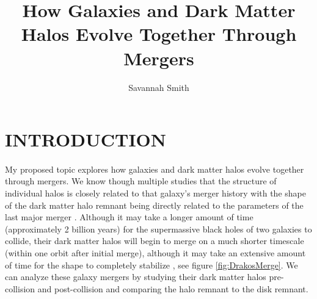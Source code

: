 \documentclass[linenumbers,trackchanges]{aastex7}
\begin{document}
\title{How Galaxies and Dark Matter Halos Evolve Together Through Mergers}

\author{Savannah Smith}

\section{INTRODUCTION} 

\paragraph{} My proposed topic explores how galaxies and dark matter halos evolve together through mergers. We know though multiple studies that the structure of individual halos is closely related to that galaxy's merger history with the shape of the dark matter halo remnant being directly related to the parameters of the last major merger \citep{Drakos+2019}. Although it may take a longer amount of time (approximately 2 billion years) for the supermassive black holes of two galaxies to collide, their dark matter halos will begin to merge on a much shorter timescale (within one orbit after initial merge), although it may take an extensive amount of time for the shape to completely stabilize \citep{Drakos+2019}, see figure \ref{fig:DrakosMerge}. We can analyze these galaxy mergers by studying their dark matter halos pre-collision and post-collision and comparing the halo remnant to the disk remnant.
\end{document}
